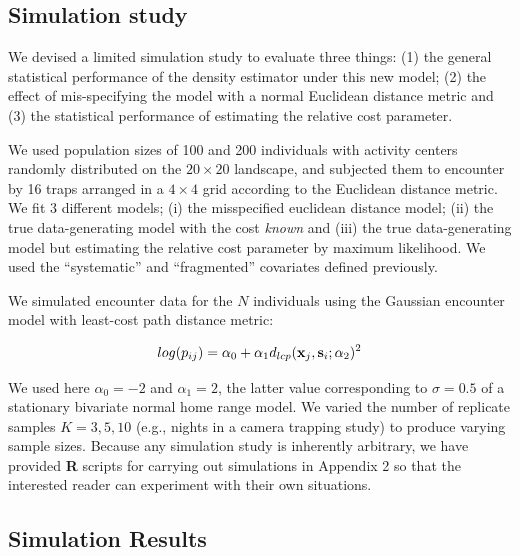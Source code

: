 \documentclass[12pt]{article}
\begin{document}
\begin{spacing}{1.8}
\subsection{Simulation study}

We devised a limited simulation study to evaluate three things: (1)
the general statistical performance of the density estimator under
this new model; (2) the effect of mis-specifying the model with a
normal Euclidean distance metric and (3) the statistical performance
of estimating the relative cost parameter.

We used population sizes of 100 and 200 individuals with activity
centers randomly distributed on the $20 \times 20$ landscape, and subjected them
to encounter by 16 traps arranged in a $4\times 4$ grid according to
the Euclidean distance metric. We fit 3 different models; (i) the
misspecified euclidean distance model; (ii) the true data-generating
model with the cost {\it known} and (iii) the true
data-generating model but estimating the relative cost parameter by
maximum likelihood.  We used the ``systematic'' and ``fragmented'' %
covariates defined previously.

We simulated encounter data for the $N$ individuals using the Gaussian
encounter model with least-cost path distance metric:

\[
log(p_{ij})= \alpha_{0} + \alpha_{1} d_{lcp}({\bf x}_{j},{\bf
  s}_{i}; \alpha_{2})^{2}
\]

{\flushleft We } used here $\alpha_{0} = -2$ and $\alpha_{1} = 2$, the latter value
corresponding to $\sigma = 0.5$ of a stationary bivariate normal home
range model.  We varied the number of replicate samples $K=3,5,10$
(e.g., nights in a camera trapping study) to produce varying sample
sizes.  Because any simulation study is inherently arbitrary, we have
provided {\bf R} scripts for carrying out simulations in Appendix 2 so
that the interested reader can experiment with their own situations.




\subsection{Simulation Results}


\end{spacing}
\end{document}
